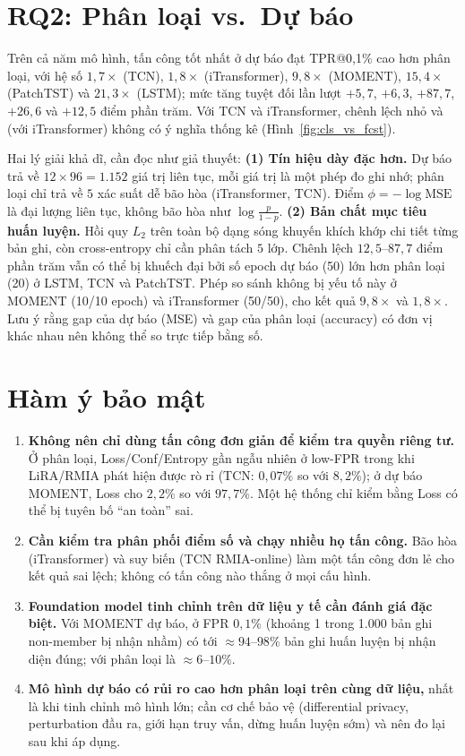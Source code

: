 \documentclass[12pt,a4paper]{report}
\begin{document}
\section{RQ2: Phân loại vs.\ Dự báo}

Trên cả năm mô hình, tấn công tốt nhất ở dự báo đạt TPR@0,1\% cao hơn phân loại, với hệ số $1{,}7\times$ (TCN), $1{,}8\times$ (iTransformer), $9{,}8\times$ (MOMENT), $15{,}4\times$ (PatchTST) và $21{,}3\times$ (LSTM); mức tăng tuyệt đối lần lượt $+5{,}7$, $+6{,}3$, $+87{,}7$, $+26{,}6$ và $+12{,}5$ điểm phần trăm. Với TCN và iTransformer, chênh lệch nhỏ và (với iTransformer) không có ý nghĩa thống kê (Hình~\ref{fig:cls_vs_fcst}).

Hai lý giải khả dĩ, cần đọc như giả thuyết: \textbf{(1) Tín hiệu dày đặc hơn.} Dự báo trả về $12 \times 96 = 1.152$ giá trị liên tục, mỗi giá trị là một phép đo ghi nhớ; phân loại chỉ trả về $5$ xác suất dễ bão hòa (iTransformer, TCN). Điểm $\phi = -\log\mathrm{MSE}$ là đại lượng liên tục, không bão hòa như $\log\frac{p}{1-p}$. \textbf{(2) Bản chất mục tiêu huấn luyện.} Hồi quy $L_2$ trên toàn bộ dạng sóng khuyến khích khớp chi tiết từng bản ghi, còn cross-entropy chỉ cần phân tách $5$ lớp. Chênh lệch $12{,}5$--$87{,}7$ điểm phần trăm vẫn có thể bị khuếch đại bởi số epoch dự báo (50) lớn hơn phân loại (20) ở LSTM, TCN và PatchTST. Phép so sánh không bị yếu tố này ở MOMENT (10/10 epoch) và iTransformer (50/50), cho kết quả $9{,}8\times$ và $1{,}8\times$. Lưu ý rằng gap của dự báo (MSE) và gap của phân loại (accuracy) có đơn vị khác nhau nên không thể so trực tiếp bằng số.

\section{Hàm ý bảo mật}

\begin{enumerate}
  \item \textbf{Không nên chỉ dùng tấn công đơn giản để kiểm tra quyền riêng tư.} Ở phân loại, Loss/Conf/Entropy gần ngẫu nhiên ở low-FPR trong khi LiRA/RMIA phát hiện được rò rỉ (TCN: $0{,}07\%$ so với $8{,}2\%$); ở dự báo MOMENT, Loss cho $2{,}2\%$ so với $97{,}7\%$. Một hệ thống chỉ kiểm bằng Loss có thể bị tuyên bố ``an toàn'' sai.
  \item \textbf{Cần kiểm tra phân phối điểm số và chạy nhiều họ tấn công.} Bão hòa (iTransformer) và suy biến (TCN RMIA-online) làm một tấn công đơn lẻ cho kết quả sai lệch; không có tấn công nào thắng ở mọi cấu hình.
  \item \textbf{Foundation model tinh chỉnh trên dữ liệu y tế cần đánh giá đặc biệt.} Với MOMENT dự báo, ở FPR $0{,}1\%$ (khoảng 1 trong 1.000 bản ghi non-member bị nhận nhầm) có tới $\approx 94$--$98\%$ bản ghi huấn luyện bị nhận diện đúng; với phân loại là $\approx 6$--$10\%$.
  \item \textbf{Mô hình dự báo có rủi ro cao hơn phân loại trên cùng dữ liệu,} nhất là khi tinh chỉnh mô hình lớn; cần cơ chế bảo vệ (differential privacy, perturbation đầu ra, giới hạn truy vấn, dừng huấn luyện sớm) và nên đo lại sau khi áp dụng.
\end{enumerate}
\end{document}
